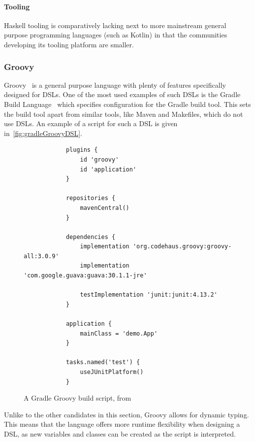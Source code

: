 \paragraph{Tooling} Haskell tooling is comparatively lacking next to more mainstream general purpose programming languages (such as Kotlin) in that the communities developing its tooling platform are smaller.

\subsubsection{Groovy}

Groovy~\cite{groovyLangIndex} is a general purpose language with plenty of features specifically designed for DSLs.
One of the most used examples of such DSLs is the Gradle Build Language~\cite{gradleDSL} which specifies configuration for the Gradle build tool.
This sets the build tool apart from similar tools, like Maven and Makefiles, which do not use DSLs.
An example of a script for such a DSL is given in~\autoref{fig:gradleGroovyDSL}.

\begin{figure}[h]
    \centering
    \begin{minipage}{0.8\textwidth}
        \begin{verbatim}
            plugins {
                id 'groovy'
                id 'application'
            }

            repositories {
                mavenCentral()
            }

            dependencies {
                implementation 'org.codehaus.groovy:groovy-all:3.0.9'
                implementation 'com.google.guava:guava:30.1.1-jre'

                testImplementation 'junit:junit:4.13.2'
            }

            application {
                mainClass = 'demo.App'
            }

            tasks.named('test') {
                useJUnitPlatform()
            }
        \end{verbatim}
    \end{minipage}
    \caption[Gradle Groovy Build script]
    {A Gradle Groovy build script, from~\cite{gradleDSL}}
    \label{fig:gradleGroovyDSL}
\end{figure}

Unlike to the other candidates in this section, Groovy allows for dynamic typing.
This means that the language offers more runtime flexibility when designing a DSL, as new variables and classes can be created as the script is interpreted.


